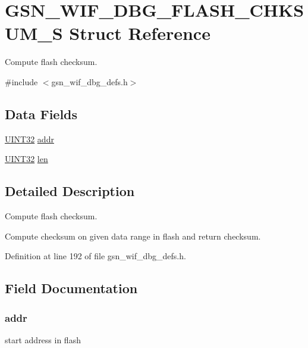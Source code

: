 \hypertarget{a00327}{
\section{GSN\_\-WIF\_\-DBG\_\-FLASH\_\-CHKSUM\_\-S Struct Reference}
\label{a00327}
}


Compute flash checksum.  




{\ttfamily \#include $<$gsn\_\-wif\_\-dbg\_\-defs.h$>$}

\subsection*{Data Fields}
\begin{DoxyCompactItemize}
\item 
\hyperlink{a00660_gae1e6edbbc26d6fbc71a90190d0266018}{UINT32} \hyperlink{a00327_a211571ed47a0fee2d898236395234dab}{addr}
\item 
\hyperlink{a00660_gae1e6edbbc26d6fbc71a90190d0266018}{UINT32} \hyperlink{a00327_ab9abc6ede61238a05664f9c37e4412c3}{len}
\end{DoxyCompactItemize}


\subsection{Detailed Description}
Compute flash checksum. 

Compute checksum on given data range in flash and return checksum. 

Definition at line 192 of file gsn\_\-wif\_\-dbg\_\-defs.h.



\subsection{Field Documentation}
\hypertarget{a00327_a211571ed47a0fee2d898236395234dab}{
\subsubsection[{addr}]{ {\bf addr}}}
\label{a00327_a211571ed47a0fee2d898236395234dab}
start address in flash 

